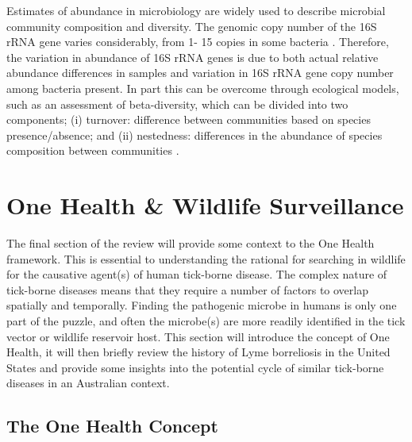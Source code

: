 \documentclass[a4paper, nobind]{templates/ociamthesis}
\begin{document}
Estimates of abundance in microbiology are widely used to describe microbial community composition and diversity.
The genomic copy number of the 16S rRNA gene varies considerably, from 1- 15 copies in some bacteria \autocite{loucaCorrecting16SRRNA2018}.
Therefore, the variation in abundance of 16S rRNA genes is due to both actual relative abundance differences in samples and variation in 16S rRNA gene copy number among bacteria present.
In part this can be overcome through ecological models, such as an assessment of beta-diversity, which can be divided into two components; (i) turnover: difference between communities based on species presence/absence; and (ii) nestedness: differences in the abundance of species composition between communities \autocite{baselgaPartitioningTurnoverNestedness2010,baselgaBetapartPartioningBeta2017}.

\hypertarget{one-health-wildlife-surveillance}{%
\section{One Health \& Wildlife Surveillance}\label{one-health-wildlife-surveillance}}

The final section of the review will provide some context to the One Health framework.
This is essential to understanding the rational for searching in wildlife for the causative agent(s) of human tick-borne disease.
The complex nature of tick-borne diseases means that they require a number of factors to overlap spatially and temporally.
Finding the pathogenic microbe in humans is only one part of the puzzle, and often the microbe(s) are more readily identified in the tick vector or wildlife reservoir host.
This section will introduce the concept of One Health, it will then briefly review the history of Lyme borreliosis in the United States and provide some insights into the potential cycle of similar tick-borne diseases in an Australian context.

\hypertarget{the-one-health-concept}{%
\subsection{The One Health Concept}\label{the-one-health-concept}}
\end{document}
